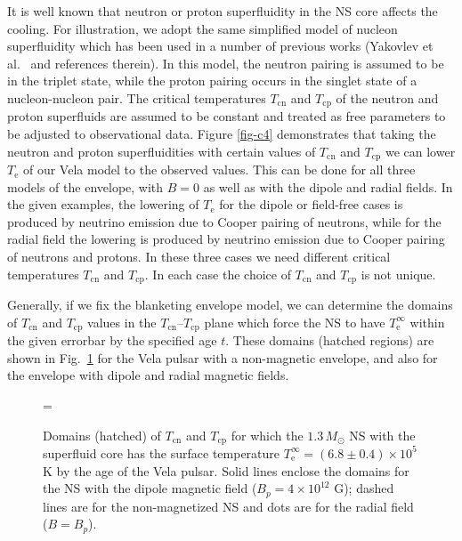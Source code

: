 \documentclass{aa}
\begin{document}
It is well known that
neutron or proton superfluidity in the NS core
affects the cooling.
For illustration, we adopt the same simplified model
of nucleon superfluidity which has been used in
a number of previous works
(Yakovlev et al.\ \cite{yaketal99} and references therein).
In this model, the neutron pairing is
assumed to be in the triplet state, while the
proton pairing occurs in the singlet state of
a nucleon-nucleon pair. 
The critical temperatures $T_\mathrm{cn}$
and $T_\mathrm{cp}$ of the neutron and proton superfluids are
assumed to be constant and treated as free parameters
to be adjusted to observational data.
Figure \ref{fig-c4} demonstrates that taking
the neutron and proton superfluidities with certain
values of $T_\mathrm{cn}$ and $T_\mathrm{cp}$
we can lower $T_\mathrm{e}$ of our
Vela model to the observed values. This can be done for all
three models of the envelope, with $B=0$ as well as with the
dipole and radial fields. In the given examples,
the lowering of $T_\mathrm{e}$ 
for the dipole or field-free cases is 
produced by neutrino emission due to Cooper
pairing of neutrons, while for the radial
field the lowering is produced by neutrino
emission due to Cooper pairing of neutrons and protons.
In these three cases
we need different critical temperatures $T_\mathrm{cn}$
and $T_\mathrm{cp}$. In each case the choice of $T_\mathrm{cn}$
and $T_\mathrm{cp}$ is not unique.

%
Generally, if we fix the blanketing envelope model,
we can determine the domains of $T_\mathrm{cn}$ and
$T_\mathrm{cp}$ values in the $T_\mathrm{cn}$--$T_\mathrm{cp}$ plane
which force the NS
to have $T_\mathrm{e}^\infty$ within the
given errorbar by the specified age $t$.
These domains (hatched regions) are shown in Fig.\ \ref{fig-c5}
for the Vela pulsar with a non-magnetic envelope,
and also for the envelope
with dipole and radial magnetic fields.

\begin{figure}
\centering
\epsfxsize=\hsize
{}
\caption{Domains (hatched)
  of $T_\mathrm{cn}$ and $T_\mathrm{cp}$
  for which the $1.3 \, M_\odot$ NS
  with the superfluid core has
  the surface temperature
  $T_\mathrm{e}^\infty=(6.8 \pm 0.4) \times 10^5$ K
  by the age of the Vela pulsar.
  Solid lines enclose the domains
  for the NS with the dipole magnetic field ($B_p=4 \times 10^{12}$ G);
  dashed lines are for the non-magnetized NS
  and dots are for the radial field ($B=B_p$).
}
\label{fig-c5}
\end{figure}
\end{document}

